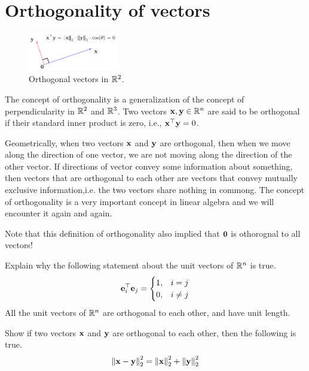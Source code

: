 \section{Orthogonality of vectors}

\begin{figure}
    \centering
    \includegraphics[width=0.35\textwidth]{figure/chapter01/ortho-demo.pdf}
    \caption{Orthogonal vectors in $\mathbb{R}^2$.}
    \label{fig:orthog-vectors}
\end{figure}
The concept of orthogonality is a generalization of the concept of perpendicularity in $\mathbb{R}^2$ and $\mathbb{R}^3$. Two vectors $\mathbf{x}, \mathbf{y} \in \mathbb{R}^n$ are said to be orthogonal if their standard inner product is zero, i.e., $\mathbf{x}^\top\mathbf{y} = 0$.

Geometrically, when two vectors $\mathbf{x}$ and $\mathbf{y}$ are orthogonal, then when we move along the direction of one vector, we are not moving along the direction of the other vector. If directions of vector convey some information about something, then vectors that are orthogonal to each other are vectors that convey mutually exclusive information,i.e. the two vectors share nothing in commong. The concept of orthogonality is a very important concept in linear algebra and we will encounter it again and again.

Note that this definition of orthogonality also implied that $\mathbf{0}$ is othorognal to all vectors!

\begin{boxedstuff}
    \begin{problem}
        Explain why the following statement about the unit vectors of $\mathbb{R}^n$ is true.
        \[ \mathbf{e}_i^\top\mathbf{e}_j = \begin{cases} 1, & i = j \\ 0, & i \neq j \end{cases} \]
        All the unit vectors of $\mathbb{R}^n$ are orthogonal to each other, and have unit length.
    \end{problem}
    \begin{problem}
        Show if two vectors $\mathbf{x}$ and $\mathbf{y}$ are orthogonal to each other, then the following is true.
        \[ \left\lVert \mathbf{x} - \mathbf{y} \right\rVert_2^2 = \left\lVert \mathbf{x} \right\rVert_2^2 + \left\lVert \mathbf{y} \right\rVert_2^2 \]
    \end{problem}
\end{boxedstuff}

